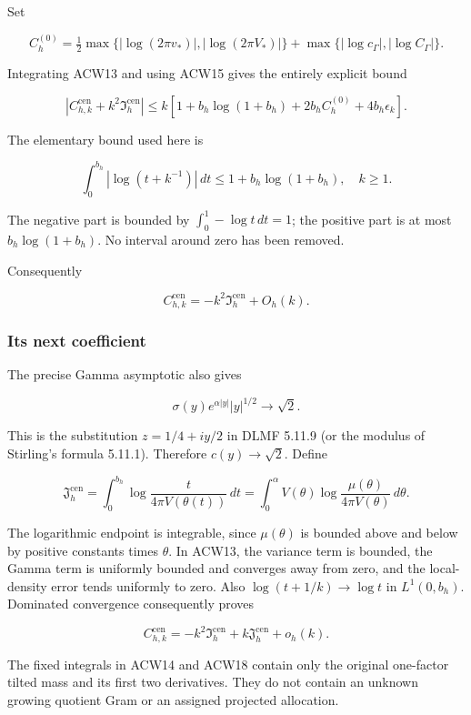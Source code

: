\documentclass[11pt,a4paper]{article}
\begin{document}
Set

\[
C_h^{(0)}=
\tfrac12\max\{|\log(2\pi v_*)|,|\log(2\pi V_*)|\}
+\max\{|\log c_\Gamma|,|\log C_\Gamma|\}.
\]

Integrating ACW13 and using ACW15 gives the entirely explicit bound

\[
\boxed{
\left|C_{h,k}^{\mathrm{cen}}+k^2\mathfrak I_h^{\mathrm{cen}}\right|
\le k\left[
1+b_h\log(1+b_h)+2b_h C_h^{(0)}+4b_h\epsilon_k
\right].}
\tag{ACW16}
\]

The elementary bound used here is

\[
\int_0^{b_h}|\log(t+k^{-1})|\,dt
\le1+b_h\log(1+b_h),\quad k\ge1.
\]

The negative part is bounded by \(\int_0^1-\log t\,dt=1\); the positive part is at most \(b_h\log(1+b_h)\). No interval around zero has been removed.

Consequently

\[
\boxed{C_{h,k}^{\mathrm{cen}}=-k^2\mathfrak I_h^{\mathrm{cen}}+O_h(k).}
\tag{ACW17}
\]

\subsubsection{Its next coefficient}\label{acw:its-next-coefficient}

The precise Gamma asymptotic also gives

\[
\sigma(y)e^{\alpha|y|}|y|^{1/2}\longrightarrow\sqrt2.
\]

This is the substitution \(z=1/4+iy/2\) in DLMF 5.11.9 (or the modulus of Stirling's formula 5.11.1). Therefore \(c(y)\to\sqrt2\). Define

\[
\mathfrak J_h^{\mathrm{cen}}
=\int_0^{b_h}
\log\frac{t}{4\pi V(\theta(t))}\,dt
=\int_0^\alpha
V(\theta)\log\frac{\mu(\theta)}{4\pi V(\theta)}\,d\theta.
\tag{ACW18}
\]

The logarithmic endpoint is integrable, since \(\mu(\theta)\) is bounded above and below by positive constants times \(\theta\). In ACW13, the variance term is bounded, the Gamma term is uniformly bounded and converges away from zero, and the local-density error tends uniformly to zero. Also \(\log(t+1/k)\to\log t\) in \(L^1(0,b_h)\). Dominated convergence consequently proves

\[
\boxed{
C_{h,k}^{\mathrm{cen}}
=-k^2\mathfrak I_h^{\mathrm{cen}}
+k\mathfrak J_h^{\mathrm{cen}}+o_h(k).}
\tag{ACW19}
\]

The fixed integrals in ACW14 and ACW18 contain only the original one-factor tilted mass and its first two derivatives. They do not contain an unknown growing quotient Gram or an assigned projected allocation.
\end{document}
